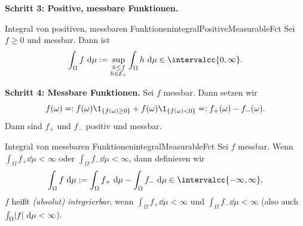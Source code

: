 \documentclass[language=ngerman]{../../Template/TemplateLecture}
\begin{document}
\textbf{Schritt 3: Positive, messbare Funktionen.}
\begin{defi}{Integral von positiven, messbaren Funktionen}{integralPositiveMeasurableFct}
    Sei $f \geq 0$ und messbar. Dann ist
    \begin{equation}
        \int_\Omega f\dd\mu := \sup_{\substack{h \leq f \\ h \in \cE_+}} \int_\Omega h\dd\mu \in \intervalcc{0,\infty}.
    \end{equation}
\end{defi}

\textbf{Schritt 4: Messbare Funktionen.}
Sei $f$ messbar. Dann setzen wir 
\begin{equation}
    f(\omega) =: f(\omega)\1_{\set{f(\omega) \geq 0}} + f(\omega)\1_{\set{f(\omega) < 0}} =: f_+(\omega) - f_-(\omega). 
\end{equation}
Dann sind $f_+$ und $f_-$ positiv und messbar.

\begin{defi}{Integral von messbaren Funktionen}{integralMeasurableFct}
    Sei $f$ messbar. Wenn $\int_\Omega f_+ \dd\mu < \infty$ oder $\int_\Omega f_- \dd\mu < \infty$, dann definieren wir 
    \begin{equation}
        \int_\Omega f\dd\mu := \int_\Omega f_+ \dd\mu - \int_\Omega f_- \dd\mu \in \intervalcc{-\infty,\infty}.
    \end{equation}
    $f$ heißt \emph{(absolut) integrierbar}, wenn $\int_\Omega f_+ \dd\mu < \infty$ und $\int_\Omega f_- \dd\mu < \infty$ (also auch $\int_\Omega \lvert f\rvert ~\mathrm{d}\mu < \infty$).
\end{defi}
\end{document}
